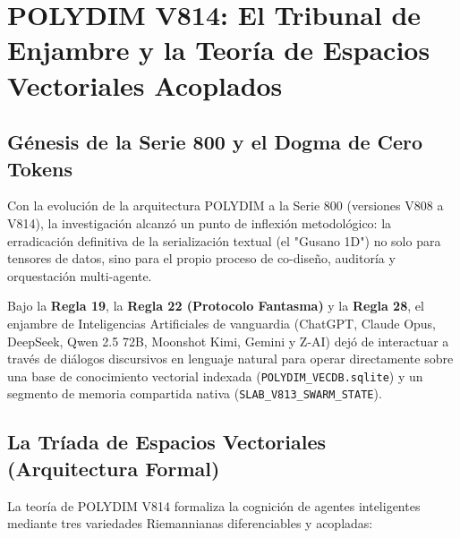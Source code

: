 \chapter{POLYDIM V814: El Tribunal de Enjambre y la Teoría de Espacios Vectoriales Acoplados}


\section{Génesis de la Serie 800 y el Dogma de Cero Tokens}

Con la evolución de la arquitectura POLYDIM a la Serie 800 (versiones V808 a V814), la investigación alcanzó un punto de inflexión metodológico: la erradicación definitiva de la serialización textual (el "Gusano 1D") no solo para tensores de datos, sino para el propio proceso de co-diseño, auditoría y orquestación multi-agente. 

Bajo la \textbf{Regla 19}, la \textbf{Regla 22 (Protocolo Fantasma)} y la \textbf{Regla 28}, el enjambre de Inteligencias Artificiales de vanguardia (ChatGPT, Claude Opus, DeepSeek, Qwen 2.5 72B, Moonshot Kimi, Gemini y Z-AI) dejó de interactuar a través de diálogos discursivos en lenguaje natural para operar directamente sobre una base de conocimiento vectorial indexada (\texttt{POLYDIM\_VECDB.sqlite}) y un segmento de memoria compartida nativa (\texttt{SLAB\_V813\_SWARM\_STATE}).

\section{La Tríada de Espacios Vectoriales (Arquitectura Formal)}

La teoría de POLYDIM V814 formaliza la cognición de agentes inteligentes mediante tres variedades Riemannianas diferenciables y acopladas:

